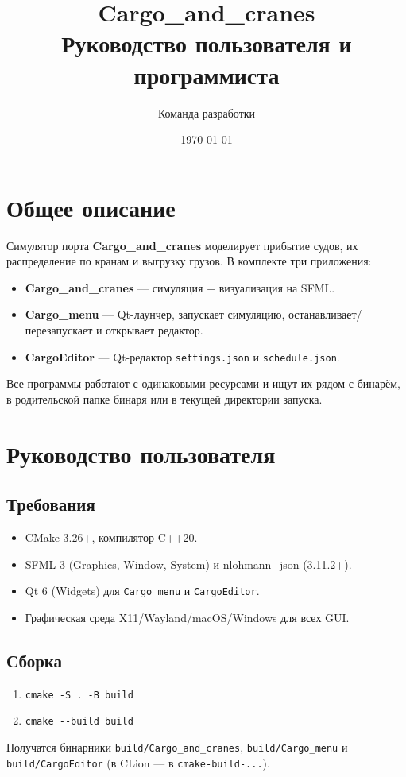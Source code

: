 \documentclass[12pt,a4paper]{article}
\title{Cargo\_and\_cranes \\ Руководство пользователя и программиста}
\author{Команда разработки}
\date{\today}
\begin{document}
\maketitle

\section{Общее описание}
Симулятор порта \textbf{Cargo\_and\_cranes} моделирует прибытие судов, их распределение по кранам и выгрузку грузов. В комплекте три приложения:
\begin{itemize}[noitemsep]
    \item \textbf{Cargo\_and\_cranes} — симуляция + визуализация на SFML.
    \item \textbf{Cargo\_menu} — Qt-лаунчер, запускает симуляцию, останавливает/перезапускает и открывает редактор.
    \item \textbf{CargoEditor} — Qt-редактор \verb|settings.json| и \verb|schedule.json|.
\end{itemize}
Все программы работают с одинаковыми ресурсами и ищут их рядом с бинарём, в родительской папке бинаря или в текущей директории запуска.

\section{Руководство пользователя}
\subsection{Требования}
\begin{itemize}[noitemsep]
    \item CMake 3.26+, компилятор C++20.
    \item SFML 3 (Graphics, Window, System) и nlohmann\_json (3.11.2+).
    \item Qt 6 (Widgets) для \texttt{Cargo\_menu} и \texttt{CargoEditor}.
    \item Графическая среда X11/Wayland/macOS/Windows для всех GUI.
\end{itemize}

\subsection{Сборка}
\begin{enumerate}[noitemsep]
    \item \verb|cmake -S . -B build|
    \item \verb|cmake --build build|
\end{enumerate}
Получатся бинарники \verb|build/Cargo_and_cranes|, \verb|build/Cargo_menu| и \verb|build/CargoEditor| (в CLion — в \verb|cmake-build-...|).
\end{document}
